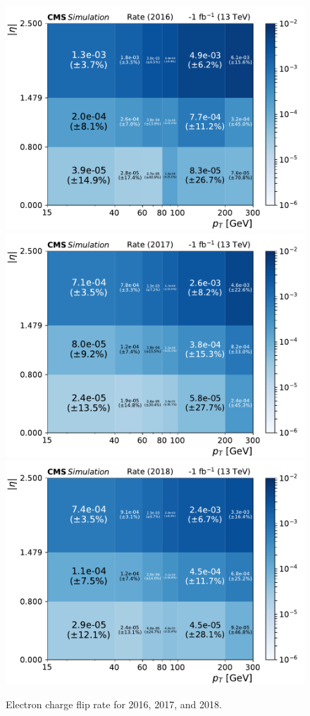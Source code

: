 \begin{figure}[!hbtp]
\centering
\centering
\includegraphics[width=.48\textwidth]{figs/ftan/flips/y2016/fliprate.pdf}
\includegraphics[width=.48\textwidth]{figs/ftan/flips/y2017/fliprate.pdf}
\includegraphics[width=.48\textwidth]{figs/ftan/flips/y2018/fliprate.pdf}
\caption{ Electron charge flip rate for 2016, 2017, and 2018. }
\label{fig:fliprate}
\end{figure}

